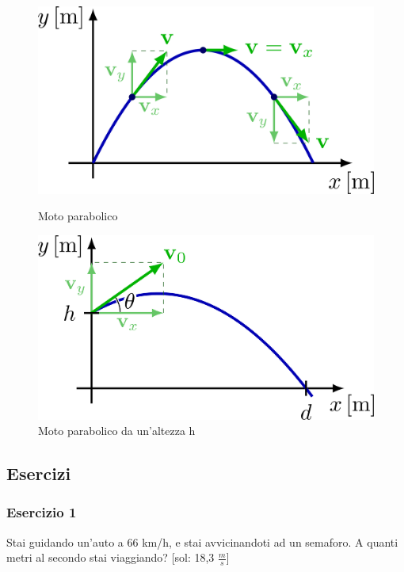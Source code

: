 \begin{figure}[H]
    \centering
    \begin{minipage}[c]{0.45\textwidth}
        \centering
        \includegraphics[width=1\textwidth]{image/motoParabolico.png}
        \caption{Moto parabolico}
        \label{fig:motoPara}
    \end{minipage}%
    \hspace{10mm}%
    \begin{minipage}[c]{0.45\textwidth}
        \centering
        \includegraphics[width=1\textwidth]{image/motoParabolicoinAltezza.png}
        \caption{Moto parabolico da un'altezza h}
        \label{img:motoParaAltezza}
    \end{minipage}
\end{figure}


\subsection{Esercizi}

\subsubsection{Esercizio 1}
Stai guidando un'auto a 66 km/h, e stai avvicinandoti ad un semaforo. A quanti metri al secondo stai viaggiando? [sol: 18,3 $\frac{m}{s}$]

